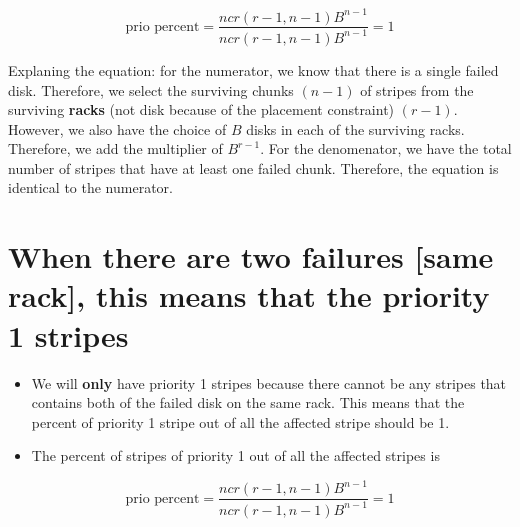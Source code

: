 \documentclass[journal]{IEEEtran}
\begin{document}
\begin{equation*}
  \text{prio percent}=\frac{ncr(r-1,n-1)B^{n-1}}{ncr(r-1,n-1)B^{n-1}}=1
\end{equation*}

Explaning the equation: for the numerator, we know that there is a single failed disk. Therefore, we select the surviving chunks $(n-1)$ of stripes from the surviving \textbf{racks} (not disk because of the placement constraint) $(r-1)$. However, we also have the choice of $B$ disks in each of the surviving racks. Therefore, we add the multiplier of $B^{r-1}$. For the denomenator, we have the total number of stripes that have at least one failed chunk. Therefore, the equation is identical to the numerator.




\section{When there are two failures [same rack], this means that the \textbf{priority 1 stripes} }
\begin{itemize}
  \item We will \textbf{only} have priority 1 stripes because there cannot be any stripes that contains both of the failed disk on the same rack. This means that the percent of priority 1 stripe out of all the affected stripe should be 1.
  \item The percent of stripes of priority 1 out of all the affected stripes is
\end{itemize}

\begin{equation*}
  \text{prio percent}=\frac{ncr(r-1, n-1)B^{n-1}}{ncr(r-1, n-1)B^{n-1}}=1
\end{equation*}
\end{document}

